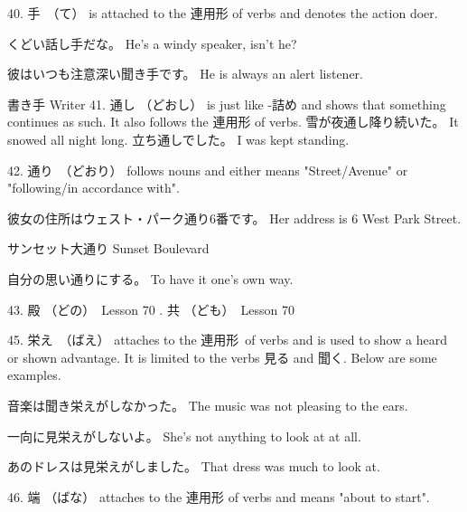 \par{40. 手　（て） is attached to the 連用形 of verbs and denotes the action doer. }

\par{くどい話し手だな。 \hfill\break
He's a windy speaker, isn't he? }

\par{彼はいつも注意深い聞き手です。 \hfill\break
He is always an alert listener. }

\par{書き手 \hfill\break
Writer }
41. 通し （どおし） is just like -詰め and shows that something continues as such. It also follows the 連用形 of verbs. \hfill\break
\hfill\break
雪が夜通し降り続いた。 \hfill\break
It snowed all night long. \hfill\break
\hfill\break
立ち通しでした。 \hfill\break
I was kept standing. 
\par{42. 通り　（どおり） follows nouns and either means "Street\slash Avenue" or "following\slash in accordance with". }

\par{彼女の住所はウェスト・パーク通り6番です。 \hfill\break
Her address is 6 West Park Street. }

\par{サンセット大通り \hfill\break
Sunset Boulevard }

\par{自分の思い通りにする。 \hfill\break
To have it one's own way. }

\par{43. 殿 （どの）　\textrightarrow  Lesson 70  \hfill{}. 共 （ども）　\textrightarrow  Lesson 70  \hfill\break
}

\par{45. 栄え　（ばえ） attaches to the 連用形 of verbs and is used to show a heard or shown advantage. It is limited to the verbs 見る and 聞く. Below are some examples. }

\par{音楽は聞き栄えがしなかった。 \hfill\break
The music was not pleasing to the ears. }

\par{一向に見栄えがしないよ。 \hfill\break
She's not anything to look at at all. }

\par{あのドレスは見栄えがしました。 \hfill\break
That dress was much to look at. }

\par{46. 端 （ばな） attaches to the 連用形 of verbs and means "about to start". }

